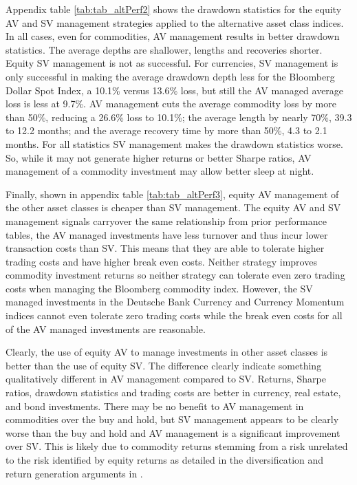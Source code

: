 Appendix table \ref{tab:tab_altPerf2} shows the drawdown statistics for the equity AV and SV management strategies applied to the alternative asset class indices. In all cases, even for commodities, AV management results in better drawdown statistics. The average depths are shallower, lengths and recoveries shorter. Equity SV management is not as successful. For currencies, SV management is only successful in making the average drawdown depth less for the Bloomberg Dollar Spot Index, a 10.1\% versus 13.6\% loss, but still the AV managed average loss is less at 9.7\%. AV management cuts the average commodity loss by more than 50\%, reducing a 26.6\% loss to 10.1\%; the average length by nearly 70\%, 39.3 to 12.2 months; and the average recovery time by more than 50\%, 4.3 to 2.1 months. For all statistics SV management makes the drawdown statistics worse. So, while it may not generate higher returns or better Sharpe ratios, AV management of a commodity investment may allow better sleep at night.


Finally, shown in appendix table \ref{tab:tab_altPerf3}, equity AV management of the other asset classes is cheaper than SV management. The equity AV and SV management signals carryover the same relationship from prior performance tables, the AV managed investments have less turnover and thus incur lower transaction costs than SV. This means that they are able to tolerate higher trading costs and have higher break even costs. Neither strategy improves commodity investment returns so neither strategy can tolerate even zero trading costs when managing the Bloomberg commodity index. However, the SV managed investments in the Deutsche Bank Currency and Currency Momentum indices cannot even tolerate zero trading costs while the break even costs for all of the AV managed investments are reasonable. 

Clearly, the use of equity AV to manage investments in other asset classes is better than the use of equity SV. The difference clearly indicate something qualitatively different in AV management compared to SV. Returns, Sharpe ratios, drawdown statistics and trading costs are better in currency, real estate, and bond investments. There may be no benefit to AV management in commodities over the buy and hold, but SV management appears to be clearly worse than the buy and hold and AV management is a significant improvement over SV. This is likely due to commodity returns stemming from a risk unrelated to the risk identified by equity returns as detailed in the diversification and return generation arguments in \citet{gorton_facts_2006,buyuksahin_commodities_2008,NBERw21243,erb_conquering_nodate}. %

